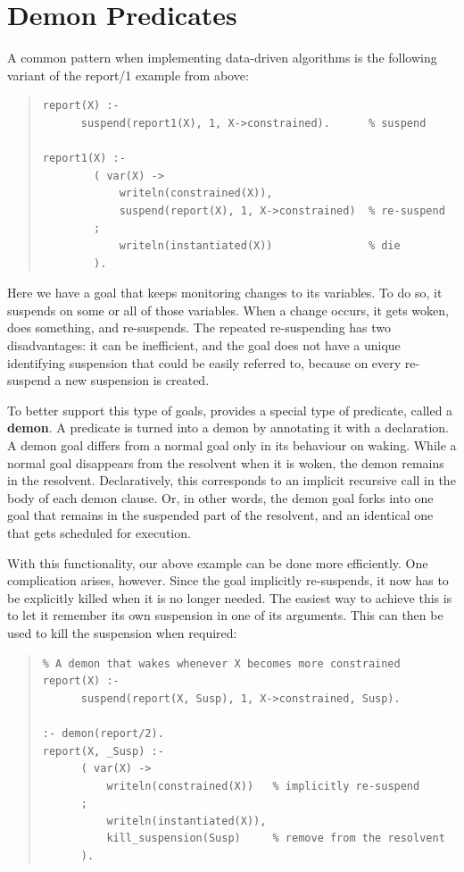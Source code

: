 

\section{Demon Predicates}
\label{secdemon}%
A common pattern when implementing data-driven algorithms is the following
variant of the report/1 example from above:
\begin{quote}\begin{verbatim}
report(X) :-
      suspend(report1(X), 1, X->constrained).      % suspend

report1(X) :-
        ( var(X) ->
            writeln(constrained(X)),
            suspend(report(X), 1, X->constrained)  % re-suspend
        ;
            writeln(instantiated(X))               % die
        ).
\end{verbatim}\end{quote}
Here we have a goal that keeps monitoring changes to its variables.
To do so, it suspends on some or all of those variables.
When a change occurs, it gets woken, does something, and re-suspends.
The repeated re-suspending has two disadvantages: it can be inefficient,
and the goal does not have a unique identifying suspension that could be
easily referred to, because on every re-suspend a new suspension is created.

To better support this type of goals, {\eclipse} provides a special type
of predicate, called a {\bf demon}. A predicate is turned into a
demon by annotating it with a
declaration.
A demon goal differs from a normal goal only in its behaviour on
waking. While a normal goal disappears from the resolvent when it is
woken, the demon remains in the resolvent.
Declaratively, this corresponds to an implicit recursive call in
the body of each demon clause.
Or, in other words, the demon goal forks into one goal that remains in the
suspended part of the resolvent, and an identical one
that gets scheduled for execution.

With this functionality, our above example can be done more
efficiently. One complication arises, however. Since the goal
implicitly re-suspends, it now has to be explicitly killed when
it is no longer needed. The easiest way to achieve this is to
let it remember its own suspension in one of its arguments.
This can then be used to kill the suspension when required:
\begin{quote}\begin{verbatim}
% A demon that wakes whenever X becomes more constrained
report(X) :-
      suspend(report(X, Susp), 1, X->constrained, Susp).

:- demon(report/2).
report(X, _Susp) :-
      ( var(X) ->
          writeln(constrained(X))   % implicitly re-suspend
      ;
          writeln(instantiated(X)),
          kill_suspension(Susp)     % remove from the resolvent
      ).
\end{verbatim}\end{quote}


